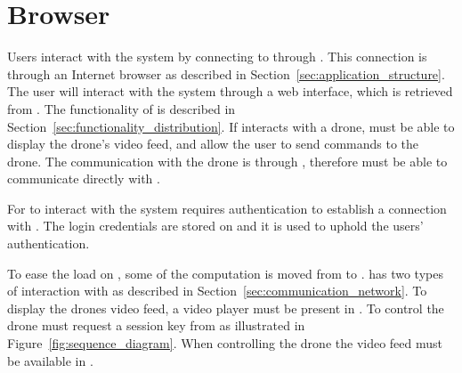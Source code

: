 \section{Browser}
\label{sec:design_client}
Users interact with the system by connecting to  through .
This connection is through an Internet browser as described in Section~\ref{sec:application_structure}.
The user will interact with the system through a web interface, which is retrieved from .
The functionality of  is described in Section~\ref{sec:functionality_distribution}.
If  interacts with a drone,  must be able to display the drone's video feed, and allow the user to send commands to the drone.
The communication with the drone is through , therefore  must be able to communicate directly with .

For  to interact with the system requires authentication to establish a connection with .
The login credentials are stored on  and it is used to uphold the users' authentication.

To ease the load on , some of the computation is moved from  to .
 has two types of interaction with  as described in Section~\ref{sec:communication_network}.
To display the drones video feed, a video player must be present in .
To control the drone  must request a session key from  as illustrated in Figure~\ref{fig:sequence_diagram}.
When controlling the drone the video feed must be available in .



